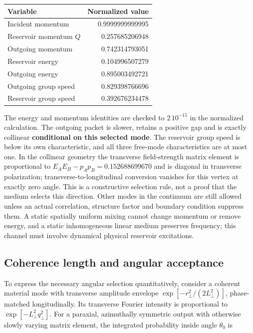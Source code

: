 \documentclass[
  11pt,
  twoside]{article}
\begin{document}
\begin{longtable}[]{@{}lr@{}}
\toprule\noalign{}
Variable & Normalized value \\
\midrule\noalign{}
\endhead
\bottomrule\noalign{}
\endlastfoot
Incident momentum & 0.9999999999995 \\
Reservoir momentum \(Q\) & 0.257685206948 \\
Outgoing momentum & 0.742314793051 \\
Reservoir energy & 0.104996507279 \\
Outgoing energy & 0.895003492721 \\
Outgoing group speed & 0.829398766696 \\
Reservoir group speed & 0.392676234478 \\
\end{longtable}

The energy and momentum identities are checked to \(2\,10^{-15}\) in the
normalized calculation. The outgoing packet is slower, retains a
positive gap and is exactly collinear \textbf{conditional on this
selected mode}. The reservoir group speed is below its own
characteristic, and all three free-mode characteristics are at most one.
In the collinear geometry the transverse field-strength matrix element
is proportional to \(E_AE_B-p_Ap_B=0.152688699670\) and is diagonal in
transverse polarization; transverse-to-longitudinal conversion vanishes
for this vertex at exactly zero angle. This is a constructive selection
rule, not a proof that the medium selects this direction. Other modes in
the continuum are still allowed unless an actual correlation, structure
factor and boundary condition suppress them. A static spatially uniform
mixing cannot change momentum or remove energy, and a static
inhomogeneous linear medium preserves frequency; this channel must
involve dynamical physical reservoir excitations.

\subsection{Coherence length and angular
acceptance}\label{coherence-length-and-angular-acceptance}

To express the necessary angular selection quantitatively, consider a
coherent material mode with transverse amplitude envelope
\(\exp[-r_\perp^2/(2L_\perp^2)]\), phase-matched longitudinally. Its
transverse Fourier intensity is proportional to
\(\exp[-L_\perp^2 q_\perp^2]\). For a paraxial, azimuthally symmetric
output with otherwise slowly varying matrix element, the integrated
probability inside angle \(\theta_0\) is
\end{document}
